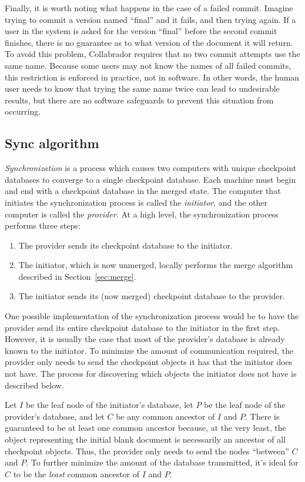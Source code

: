 \documentclass[11pt,titlepage]{article}
\begin{document}
Finally, it is worth noting what happens in the case of a failed
commit. Imagine trying to commit a version named ``final'' and it
fails, and then trying again. If a user in the system is asked for the
version ``final'' before the second commit finishes, there is no
guarantee as to what version of the document it will return. To avoid
this problem, Collabrador requires that no two commit attempts use the
same name. Because some users may not know the names of all failed
commits, this restriction is enforced in practice, not in software. In
other words, the human user needs to know that trying the same name
twice can lead to undesirable results, but there are no software
safeguards to prevent this situation from occurring.

\subsection{Sync algorithm}

\emph{Synchronization} is a process which causes two computers with 
unique checkpoint databases to converge to a single checkpoint database. 
Each machine must begin and end with a checkpoint database in the merged 
state. The computer that initiates the synchronization
process is called the \emph{initiator}, and the other computer is
called the \emph{provider}. At a high level, the synchronization
process performs three steps:
\begin{enumerate}
\item The provider sends its checkpoint database to the initiator.
\item The initiator, which is now unmerged, locally performs the merge
  algorithm described in Section~\ref{sec:merge}.
\item The initiator sends its (now merged) checkpoint database to the
  provider.
\end{enumerate}
One possible implementation of the synchronization process would be to
have the provider send its entire checkpoint database to the initiator
in the first step. However, it is usually the case that most of the
provider's database is already known to the initiator. To minimize the
amount of communication required, the provider only needs to send the
checkpoint objects it has that the initiator does not have. The process 
for discovering which objects the initiator does not have is described 
below.

Let $I$ be the leaf node of the initiator's database, let $P$ be the
leaf node of the provider's database, and let $C$ be any common
ancestor of $I$ and $P$. There is guaranteed to be at least one common
ancestor because, at the very least, the object representing the
initial blank document is necessarily an ancestor of all checkpoint
objects. Thus, the provider only needs to send the nodes ``between''
$C$ and $P$. To further minimize the amount of the database
transmitted, it's ideal for $C$ to be the \emph{least} common ancestor
of $I$ and $P$.
\end{document}
